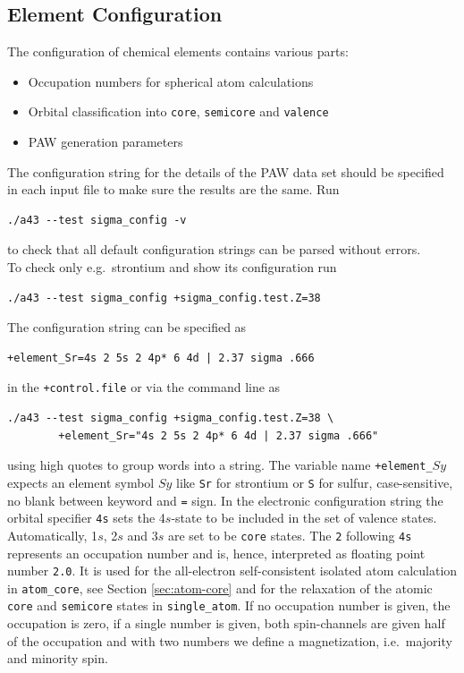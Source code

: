 \documentclass[oribibl]{llncs}
\newcommand{\ttt}[1]{\texttt{#1}}
\begin{document}
\subsection{Element Configuration} \label{sec:sigma-config}
%
The configuration of chemical elements contains various parts:
\begin{itemize}
  \item Occupation numbers for spherical atom calculations
  \item Orbital classification into \ttt{core}, \ttt{semicore} and \ttt{valence}
  \item \ac{PAW} generation parameters
\end{itemize}
%
\noindent
The configuration string for the details of the \ac{PAW} data set should be 
specified in each input file to make sure the results are the same. Run
\begin{verbatim}
./a43 --test sigma_config -v
\end{verbatim}
to check that all default configuration strings can be parsed without errors.
\\
To check only e.g.~strontium and show its configuration run
\begin{verbatim}
./a43 --test sigma_config +sigma_config.test.Z=38
\end{verbatim}
The configuration string can be specified as
\begin{verbatim}
+element_Sr=4s 2 5s 2 4p* 6 4d | 2.37 sigma .666
\end{verbatim}
in the \ttt{+control.file} or via the command line as
\begin{verbatim}
./a43 --test sigma_config +sigma_config.test.Z=38 \
        +element_Sr="4s 2 5s 2 4p* 6 4d | 2.37 sigma .666"
\end{verbatim}
using high quotes to group words into a string.
The variable name \ttt{+element\_}$Sy$ expects an element symbol $Sy$ 
like \ttt{Sr} for strontium or \ttt{S} for sulfur, case-sensitive, no blank between keyword and \ttt{=} sign.
In the electronic configuration string the orbital specifier \ttt{4s} sets the 4$s$-state to be 
included in the set of valence states. Automatically, 1$s$, 2$s$ and 3$s$ are set to 
be \ttt{core} states.
The \ttt{2} following \ttt{4s} represents an occupation number
and is, hence, interpreted as floating point number \ttt{2.0}.
It is used for the all-electron self-consistent isolated atom calculation in \ttt{atom\_core}, see Section \ref{sec:atom-core}
and for the relaxation of the atomic \ttt{core} and \ttt{semicore} states in \ttt{single\_atom}.
If no occupation number is given, the occupation is zero, if a single number is given,
both spin-channels are given half of the occupation and with two numbers
we define a magnetization, i.e.~majority and minority spin.
\end{document}
